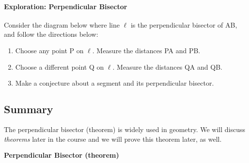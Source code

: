\paragraph{Exploration:  Perpendicular Bisector}
Consider the diagram below where line $\ell$ is the perpendicular bisector of \seg AB, and follow the directions below:\\

\begin{multicols}{2}
\begin{enumerate}
\item Choose any point \pnt P on $\ell$. 
Measure the distances \segl PA and \segl PB.

\item Choose a different point \pnt Q on $\ell$.
Measure the distances \segl QA and \segl QB.

\item Make a conjecture about a segment and its perpendicular bisector.
\end{enumerate}
	\begin{flushright}
	\end{flushright}
\end{multicols}
\medskip
\newpage

\subsection{Summary}

The perpendicular bisector (theorem) is widely used in geometry.  We will discuss \emph{theorems} later in the course and we will prove this theorem later, as well.  

\begin{tcolorbox}
\textbf{Perpendicular Bisector (theorem)}
\begin{center}
\end{center}
\end{tcolorbox}

